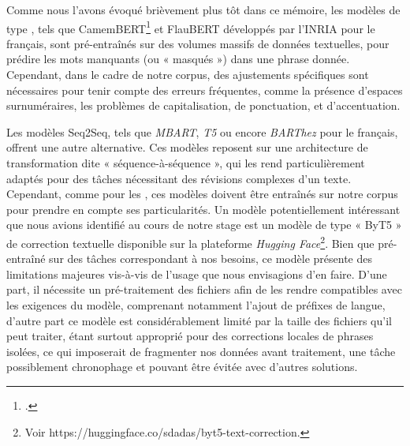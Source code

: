 \newline
Comme nous l’avons évoqué brièvement plus tôt dans ce mémoire, les modèles de type \mlm, tels que CamemBERT\footcite{martin_camembert_2020} et FlauBERT développés par l’INRIA pour le français, sont pré-entraînés sur des volumes massifs de données textuelles, pour prédire les mots manquants (ou « masqués ») dans une phrase donnée. Cependant, dans le cadre de notre corpus, des ajustements spécifiques sont nécessaires pour tenir compte des erreurs fréquentes, comme la présence d’espaces surnuméraires, les problèmes de capitalisation, de ponctuation, et d’accentuation.

\newline
Les modèles Seq2Seq, tels que \textit{MBART}, \textit{T5} ou encore \textit{BARThez} pour le français, offrent une autre alternative. Ces modèles reposent sur une architecture de transformation dite « séquence-à-séquence », qui les rend particulièrement adaptés pour des tâches nécessitant des révisions complexes d’un texte. Cependant, comme pour les \mlm, ces modèles doivent être entraînés sur notre corpus pour prendre en compte ses particularités. Un modèle potentiellement intéressant que nous avions identifié au cours de notre stage est un modèle de type « ByT5 » de correction textuelle disponible sur la plateforme \textit{Hugging Face}\footnote{Voir https://huggingface.co/sdadas/byt5-text-correction.}. Bien que pré-entraîné sur des tâches correspondant à nos besoins, ce modèle présente des limitations majeures vis-à-vis de l’usage que nous envisagions d’en faire. D’une part, il nécessite un pré-traitement des fichiers afin de les rendre compatibles avec les exigences du modèle, comprenant notamment l’ajout de préfixes de langue, d’autre part ce modèle est considérablement limité par la taille des fichiers qu’il peut traiter, étant surtout approprié pour des corrections locales de phrases isolées, ce qui imposerait de fragmenter nos données avant traitement, une tâche possiblement chronophage et pouvant être évitée avec d’autres solutions.